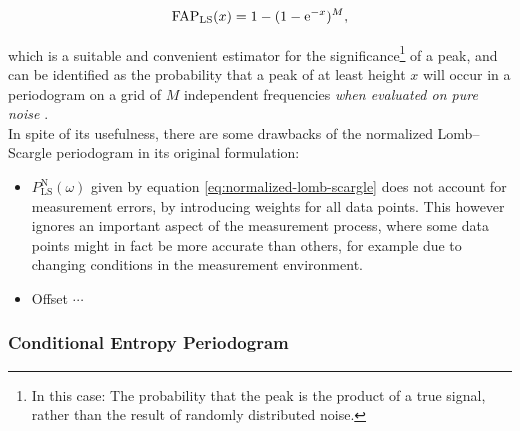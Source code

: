 \begin{equation}
\text{FAP}_{\text{LS}}(x) = 1 - (1 - \mathrm{e}^{-x})^M,
\end{equation}

which is a suitable and convenient estimator for the significance\footnote{In this case: The probability that the peak is the product of a true signal, rather than the result of randomly distributed noise.} of a peak, and can be identified as the probability that a peak of at least height $x$ will occur in a periodogram on a grid of $M$ independent frequencies \emph{when evaluated on pure noise} \citep{horne1986}.\\

In spite of its usefulness, there are some drawbacks of the normalized Lomb--Scargle periodogram in its original formulation:

\begin{itemize}
\item $P^{\text{N}}_{\text{LS}}(\omega)$ given by equation \eqref{eq:normalized-lomb-scargle} does not account for measurement errors, \eg by introducing weights for all data points. This however ignores an important aspect of the measurement process, where some data points might in fact be more accurate than others, for example due to changing conditions in the measurement environment.
\item Offset $\cdots$ %
\end{itemize}




\subsubsection{Conditional Entropy Periodogram}
\label{subsubsec:conditional-entropy}

